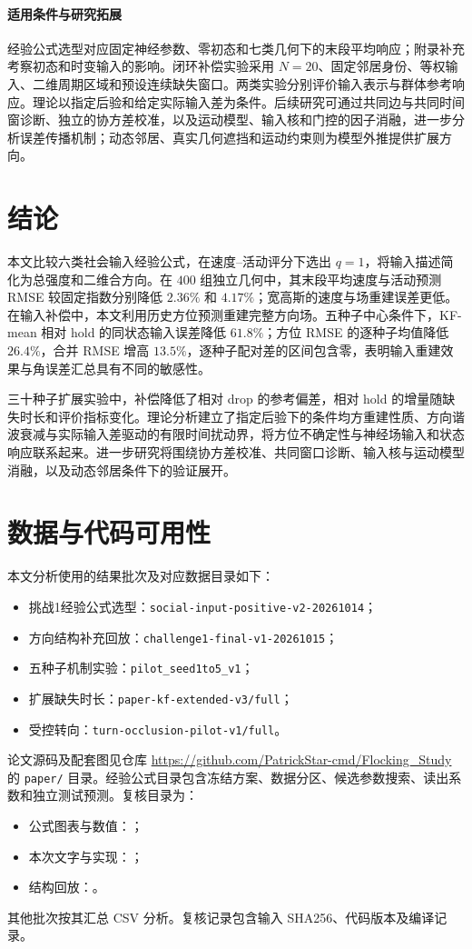 \documentclass[UTF8,fontset=windows,11pt]{ctexart}
\begin{document}
\paragraph{适用条件与研究拓展}
经验公式选型对应固定神经参数、零初态和七类几何下的末段平均响应；附录补充考察初态和时变输入的影响。闭环补偿实验采用 $N=20$、固定邻居身份、等权输入、二维周期区域和预设连续缺失窗口。两类实验分别评价输入表示与群体参考响应。理论以指定后验和给定实际输入差为条件。后续研究可通过共同边与共同时间窗诊断、独立的协方差校准，以及运动模型、输入核和门控的因子消融，进一步分析误差传播机制；动态邻居、真实几何遮挡和运动约束则为模型外推提供扩展方向。

\section{结论}

本文比较六类社会输入经验公式，在速度--活动评分下选出 $q=1$，将输入描述简化为总强度和二维合方向。在 $400$ 组独立几何中，其末段平均速度与活动预测 RMSE 较固定指数分别降低 $2.36\%$ 和 $4.17\%$；宽高斯的速度与场重建误差更低。在输入补偿中，本文利用历史方位预测重建完整方向场。五种子中心条件下，KF-mean 相对 hold 的同状态输入误差降低 $61.8\%$；方位 RMSE 的逐种子均值降低 $26.4\%$，合并 RMSE 增高 $13.5\%$，逐种子配对差的区间包含零，表明输入重建效果与角误差汇总具有不同的敏感性。

三十种子扩展实验中，补偿降低了相对 drop 的参考偏差，相对 hold 的增量随缺失时长和评价指标变化。理论分析建立了指定后验下的条件均方重建性质、方向谐波衰减与实际输入差驱动的有限时间扰动界，将方位不确定性与神经场输入和状态响应联系起来。进一步研究将围绕协方差校准、共同窗口诊断、输入核与运动模型消融，以及动态邻居条件下的验证展开。

\section*{数据与代码可用性}
本文分析使用的结果批次及对应数据目录如下：
\begin{itemize}[nosep,leftmargin=2em]
\item 挑战1经验公式选型：\texttt{social-input-positive-v2-20261014}；
\item 方向结构补充回放：\texttt{challenge1-final-v1-20261015}；
\item 五种子机制实验：\texttt{pilot\_seed1to5\_v1}；
\item 扩展缺失时长：\texttt{paper-kf-extended-v3/full}；
\item 受控转向：\texttt{turn-occlusion-pilot-v1/full}。
\end{itemize}
论文源码及配套图见仓库 \url{https://github.com/PatrickStar-cmd/Flocking_Study} 的 \texttt{paper/} 目录。经验公式目录包含冻结方案、数据分区、候选参数搜索、读出系数和独立测试预测。复核目录为：
\begin{itemize}[nosep,leftmargin=2em]
\item 公式图表与数值：；
\item 本次文字与实现：；
\item 结构回放：。
\end{itemize}
其他批次按其汇总 CSV 分析。复核记录包含输入 SHA256、代码版本及编译记录。
\end{document}
